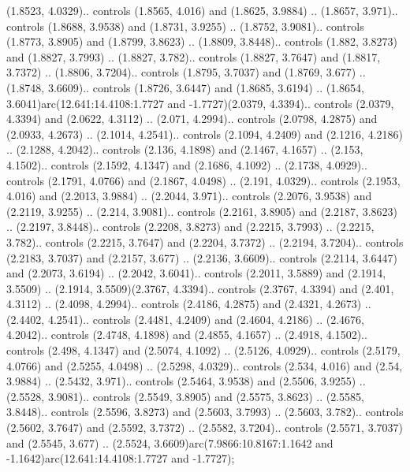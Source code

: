 (1.8523, 4.0329).. controls (1.8565, 4.016) and (1.8625, 3.9884) .. (1.8657, 3.971).. controls (1.8688, 3.9538) and (1.8731, 3.9255) .. (1.8752, 3.9081).. controls (1.8773, 3.8905) and (1.8799, 3.8623) .. (1.8809, 3.8448).. controls (1.882, 3.8273) and (1.8827, 3.7993) .. (1.8827, 3.782).. controls (1.8827, 3.7647) and (1.8817, 3.7372) .. (1.8806, 3.7204).. controls (1.8795, 3.7037) and (1.8769, 3.677) .. (1.8748, 3.6609).. controls (1.8726, 3.6447) and (1.8685, 3.6194) .. (1.8654, 3.6041)arc(12.641:14.4108:1.7727 and -1.7727)(2.0379, 4.3394).. controls (2.0379, 4.3394) and (2.0622, 4.3112) .. (2.071, 4.2994).. controls (2.0798, 4.2875) and (2.0933, 4.2673) .. (2.1014, 4.2541).. controls (2.1094, 4.2409) and (2.1216, 4.2186) .. (2.1288, 4.2042).. controls (2.136, 4.1898) and (2.1467, 4.1657) .. (2.153, 4.1502).. controls (2.1592, 4.1347) and (2.1686, 4.1092) .. (2.1738, 4.0929).. controls (2.1791, 4.0766) and (2.1867, 4.0498) .. (2.191, 4.0329).. controls (2.1953, 4.016) and (2.2013, 3.9884) .. (2.2044, 3.971).. controls (2.2076, 3.9538) and (2.2119, 3.9255) .. (2.214, 3.9081).. controls (2.2161, 3.8905) and (2.2187, 3.8623) .. (2.2197, 3.8448).. controls (2.2208, 3.8273) and (2.2215, 3.7993) .. (2.2215, 3.782).. controls (2.2215, 3.7647) and (2.2204, 3.7372) .. (2.2194, 3.7204).. controls (2.2183, 3.7037) and (2.2157, 3.677) .. (2.2136, 3.6609).. controls (2.2114, 3.6447) and (2.2073, 3.6194) .. (2.2042, 3.6041).. controls (2.2011, 3.5889) and (2.1914, 3.5509) .. (2.1914, 3.5509)(2.3767, 4.3394).. controls (2.3767, 4.3394) and (2.401, 4.3112) .. (2.4098, 4.2994).. controls (2.4186, 4.2875) and (2.4321, 4.2673) .. (2.4402, 4.2541).. controls (2.4481, 4.2409) and (2.4604, 4.2186) .. (2.4676, 4.2042).. controls (2.4748, 4.1898) and (2.4855, 4.1657) .. (2.4918, 4.1502).. controls (2.498, 4.1347) and (2.5074, 4.1092) .. (2.5126, 4.0929).. controls (2.5179, 4.0766) and (2.5255, 4.0498) .. (2.5298, 4.0329).. controls (2.534, 4.016) and (2.54, 3.9884) .. (2.5432, 3.971).. controls (2.5464, 3.9538) and (2.5506, 3.9255) .. (2.5528, 3.9081).. controls (2.5549, 3.8905) and (2.5575, 3.8623) .. (2.5585, 3.8448).. controls (2.5596, 3.8273) and (2.5603, 3.7993) .. (2.5603, 3.782).. controls (2.5602, 3.7647) and (2.5592, 3.7372) .. (2.5582, 3.7204).. controls (2.5571, 3.7037) and (2.5545, 3.677) .. (2.5524, 3.6609)arc(7.9866:10.8167:1.1642 and -1.1642)arc(12.641:14.4108:1.7727 and -1.7727);



